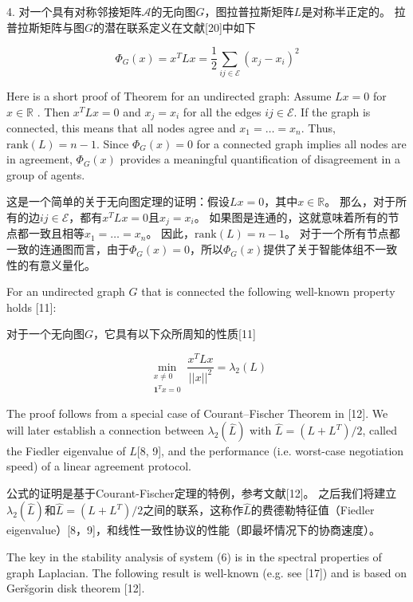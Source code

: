 \documentclass{article}
\begin{document}
 4. 对一个具有对称邻接矩阵$\mathcal{A}$的无向图$G$，图拉普拉斯矩阵$L$是对称半正定的。
拉普拉斯矩阵与图$G$的潜在联系定义在文献[20]中如下

\begin{equation}
    \Phi_G(x) = x^T Lx = \frac{1}{2} \sum_{ij\in \mathcal{E}}(x_j - x_i)^2
    \tag{13}
    \label{13}
\end{equation}

{\color[gray]{0.5}
\noindent Here is a short proof of Theorem for an undirected graph: Assume $Lx=0$ for $x\in \mathbb{R}$ . 
Then $x^TLx=0$ and $x_j=x_i$ for all the edges $ij\in \mathcal{E}$. 
If the graph is connected, this means that all nodes agree and $x_1=\dots=x_n$. 
Thus, $\text{rank}(L)=n-1$. 
Since $\Phi_G(x)=0$ for a connected graph implies all nodes are in agreement, $\Phi_G(x)$ provides a meaningful quantiﬁcation of disagreement in a group of agents.
}

\noindent 这是一个简单的关于无向图定理的证明：假设$Lx=0$，其中$x\in \mathbb{R}$。
那么，对于所有的边$ij\in \mathcal{E}$，都有$x^TLx=0$且$x_j=x_i$。
如果图是连通的，这就意味着所有的节点都一致且相等$x_1=\dots=x_n$。
因此，$\text{rank}(L)=n-1$。
对于一个所有节点都一致的连通图而言，由于$\Phi_G(x)=0$，所以$\Phi_G(x)$提供了关于智能体组不一致性的有意义量化。

{\color[gray]{0.5}
For an undirected graph $G$ that is connected the following well-known property holds [11]:
}

对于一个无向图$G$，它具有以下众所周知的性质[11]

\begin{equation}
    \min_{\substack{x\ne 0\\   \mathbf{1}^Tx=0}} \frac{x^T Lx}{||x||^2}=\lambda_2(L)
    \tag{14}
    \label{14}
\end{equation}

{\color[gray]{0.5}
\noindent The proof follows from a special case of Courant–Fischer Theorem in [12]. 
We will later establish a connection between $\lambda_2(\hat{L})$ with $\hat{L}=(L+L^T)/2$, called the Fiedler eigenvalue of $\hat{L}$[8, 9], and the performance (i.e. worst-case negotiation speed) of a linear agreement protocol.
}

\noindent 公式的证明是基于Courant-Fischer定理的特例，参考文献[12]。
之后我们将建立$\lambda_2(\hat{L})$和$\hat{L}=(L+L^T)/2$之间的联系，这称作$\hat{L}$的费德勒特征值（Fiedler eigenvalue）[8，9]，和线性一致性协议的性能（即最坏情况下的协商速度）。

{\color[gray]{0.5}
The key in the stability analysis of system (6) is in the spectral properties of graph Laplacian. 
The following result is well-known (e.g. see [17]) and is based on Ger\v sgorin disk theorem [12].
}
\end{document}
